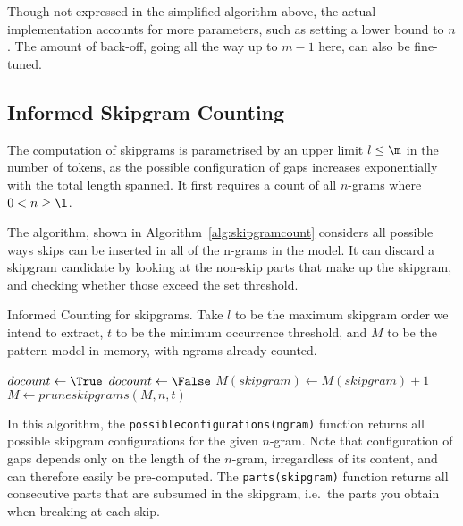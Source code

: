 Though not expressed in the simplified algorithm above, the actual
implementation accounts for more parameters, such as setting a lower bound to
$n$. The amount of back-off, going all the way up to $m-1$ here, can also be
fine-tuned.

\subsection{Informed Skipgram Counting}
\label{sec:skipgramcount}

The computation of skipgrams is parametrised by an upper limit $l\leq\m$ in the number of
tokens, as the possible configuration of gaps increases exponentially with the
total length spanned. It first requires a count of all $n$-grams where $0<n\geq\l$. 

The algorithm, shown in Algorithm~\ref{alg:skipgramcount} considers all
possible ways skips can be inserted in all of the n-grams in the model. It can
discard a skipgram candidate by looking at the non-skip parts that make up the
skipgram, and checking whether those exceed the set threshold. 

\begin{algorithm} \caption{Informed Counting for skipgrams.  Take $l$
to be the maximum skipgram order we intend to extract, $t$ to be the minimum occurrence threshold, and $M$ to be the
pattern model in memory, with ngrams already counted.}
\label{alg:skipgramcount}
\begin{algorithmic}
            \State $docount \leftarrow \True$
                    \State $docount \leftarrow \False$
                    \Break
                \EndIf
            \EndFor 
                \State $M(skipgram) \leftarrow M(skipgram) + 1$
            \EndIf
        \EndFor 
    \EndFor
  \EndFor
  \State $M \leftarrow pruneskipgrams(M,n,t)$
\EndFor \\
\end{algorithmic}
\end{algorithm}

In this algorithm, the \texttt{possibleconfigurations(ngram)} function returns
all possible skipgram configurations for the given $n$-gram. Note that
configuration of gaps depends only on the length of the $n$-gram, irregardless
of its content, and can therefore easily be pre-computed. The
\texttt{parts(skipgram)} function returns all consecutive parts that are
subsumed in the skipgram, i.e.\ the parts you obtain when breaking at each
skip.

